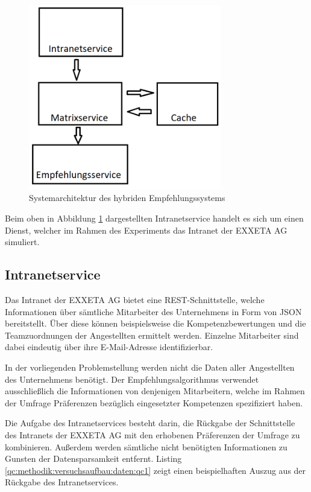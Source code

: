 \begin{figure}[h]
	\centering
	\includegraphics[width=0.75\textwidth]{gfx/Systemarchitektur.png}
	\caption{Systemarchitektur des hybriden Empfehlungssystems}
	\label{fig:methodik:systemarchitekturn:abb1}
\end{figure}

Beim oben in Abbildung \ref{fig:methodik:systemarchitekturn:abb1} dargestellten Intranetservice handelt es sich um einen Dienst, welcher im Rahmen des Experiments das Intranet der EXXETA AG simuliert.

\subsection{Intranetservice}
\label{ch:methodik:versuchsaufbau:systemarchitektur:intranetservice}
Das Intranet der EXXETA AG bietet eine REST-Schnittstelle, welche Informationen über sämtliche Mitarbeiter des Unternehmens in Form von JSON bereitstellt. Über diese können beispielsweise die Kompetenzbewertungen und die Teamzuordnungen der Angestellten ermittelt werden. Einzelne Mitarbeiter sind dabei eindeutig über ihre E-Mail-Adresse identifizierbar.

In der vorliegenden Problemstellung werden nicht die Daten aller Angestellten des Unternehmens benötigt. Der Empfehlungsalgorithmus verwendet ausschließlich die Informationen von denjenigen Mitarbeitern, welche im Rahmen der Umfrage Präferenzen bezüglich eingesetzter Kompetenzen spezifiziert haben.

Die Aufgabe des Intranetservices besteht darin, die Rückgabe der Schnittstelle des Intranets der EXXETA AG mit den erhobenen Präferenzen der Umfrage zu kombinieren. Außerdem werden sämtliche nicht benötigten Informationen zu Gunsten der Datensparsamkeit entfernt. Listing \ref{qc:methodik:versuchsaufbau:daten:qc1} zeigt einen beispielhaften Auszug aus der Rückgabe des Intranetservices.

